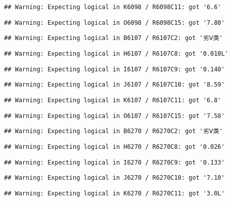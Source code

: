 \documentclass[
]{article}
\begin{document}
\begin{verbatim}
## Warning: Expecting logical in K6098 / R6098C11: got '6.6'
\end{verbatim}

\begin{verbatim}
## Warning: Expecting logical in O6098 / R6098C15: got '7.80'
\end{verbatim}

\begin{verbatim}
## Warning: Expecting logical in B6107 / R6107C2: got '劣Ⅴ类'
\end{verbatim}

\begin{verbatim}
## Warning: Expecting logical in H6107 / R6107C8: got '0.010L'
\end{verbatim}

\begin{verbatim}
## Warning: Expecting logical in I6107 / R6107C9: got '0.140'
\end{verbatim}

\begin{verbatim}
## Warning: Expecting logical in J6107 / R6107C10: got '8.59'
\end{verbatim}

\begin{verbatim}
## Warning: Expecting logical in K6107 / R6107C11: got '6.8'
\end{verbatim}

\begin{verbatim}
## Warning: Expecting logical in O6107 / R6107C15: got '7.58'
\end{verbatim}

\begin{verbatim}
## Warning: Expecting logical in B6270 / R6270C2: got '劣Ⅴ类'
\end{verbatim}

\begin{verbatim}
## Warning: Expecting logical in H6270 / R6270C8: got '0.026'
\end{verbatim}

\begin{verbatim}
## Warning: Expecting logical in I6270 / R6270C9: got '0.133'
\end{verbatim}

\begin{verbatim}
## Warning: Expecting logical in J6270 / R6270C10: got '7.10'
\end{verbatim}

\begin{verbatim}
## Warning: Expecting logical in K6270 / R6270C11: got '3.0L'
\end{verbatim}
\end{document}
